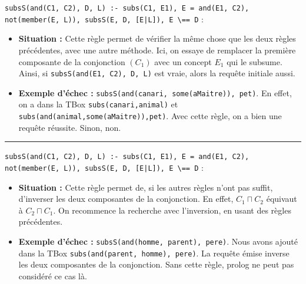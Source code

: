 \documentclass[a4paper,12pt]{report}
\begin{document}
\begin{tcolorbox}[colback=gray!10, colframe=blue!30, coltitle=black, title=Réponse à la question 3.2 - 2/2]

    \texttt{subsS(and(C1, C2), D, L) :- subs(C1, E1), E = and(E1, C2), not(member(E, L)), subsS(E, D, [E|L]), E \textbackslash== D} :\\[-0.4cm]
    \begin{itemize}
        \item \textbf{Situation :} Cette règle permet de vérifier la même chose que les deux règles précédentes, avec une autre méthode. Ici, on essaye de remplacer la
            première composante de la conjonction \((C_1)\) avec un concept \(E_1\) qui le subsume. Ainsi, si \texttt{subsS(and(E1, C2), D, L)} est vraie, alors la 
            requête initiale aussi.
        
        \vspace{0.1cm}
        \item \textbf{Exemple d'échec :} \texttt{subsS(and(canari, some(aMaitre)), pet)}. En effet, on a dans la TBox \texttt{subs(canari,animal)} et 
            \texttt{subs(and(animal,some(aMaitre)),pet)}. Avec cette règle, on a bien une requête réussite. Sinon, non. 
    \end{itemize}


    \vspace{0.5cm}
    \hrule
    \vspace{0.5cm}


    \texttt{subsS(and(C1, C2), D, L) :- subs(C1, E1), E = and(E1, C2), not(member(E, L)), subsS(E, D, [E|L]), E \textbackslash== D} :\\[-0.4cm]
    \begin{itemize}
        \item \textbf{Situation :} Cette règle permet de, si les autres règles n'ont pas suffit, d'inverser les deux composantes de la conjonction. En effet, 
            \(C_1 \sqcap C_2\) équivaut à \(C_2 \sqcap C_1\). On recommence la recherche avec l'inversion, en usant des règles précédentes.
        
        \vspace{0.1cm}
        \item \textbf{Exemple d'échec :} \texttt{subsS(and(homme, parent), pere)}. Nous avons ajouté dans la TBox \texttt{subs(and(parent, homme), pere)}. La requête
            émise inverse les deux composantes de la conjonction. Sans cette règle, prolog ne peut pas considéré ce cas là.
    \end{itemize}

\end{tcolorbox}
\end{document}
